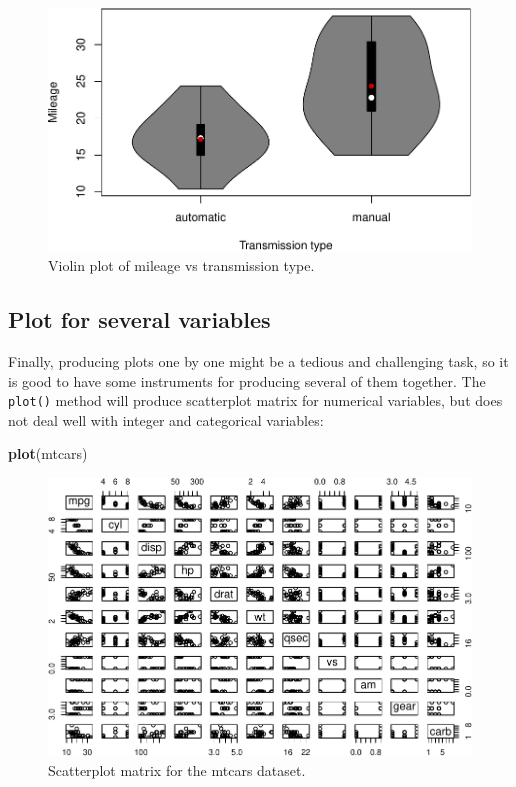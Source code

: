 \documentclass[
]{book}
\newenvironment{Shaded}{\begin{snugshade}}{\end{snugshade}}
\newcommand{\KeywordTok}[1]{\textcolor[rgb]{0.13,0.29,0.53}{\textbf{#1}}}
\newcommand{\NormalTok}[1]{#1}
\theoremstyle{definition}
\theoremstyle{definition}
\theoremstyle{definition}
\theoremstyle{definition}
\theoremstyle{remark}
\begin{document}
\begin{figure}
\centering
\includegraphics{Svetunkov---Statistics-for-Business-Analytics_files/figure-latex/vioAMMPG-1.pdf}
\caption{\label{fig:vioAMMPG}Violin plot of mileage vs transmission type.}
\end{figure}

\hypertarget{plot-for-several-variables}{%
\subsection{Plot for several variables}\label{plot-for-several-variables}}

Finally, producing plots one by one might be a tedious and challenging task, so it is good to have some instruments for producing several of them together. The \texttt{plot()} method will produce scatterplot matrix for numerical variables, but does not deal well with integer and categorical variables:

\begin{Shaded}
\begin{Highlighting}[]
\KeywordTok{plot}\NormalTok{(mtcars)}
\end{Highlighting}
\end{Shaded}

\begin{figure}
\centering
\includegraphics{Svetunkov---Statistics-for-Business-Analytics_files/figure-latex/scatterMatrix-1.pdf}
\caption{\label{fig:scatterMatrix}Scatterplot matrix for the mtcars dataset.}
\end{figure}
\end{document}
